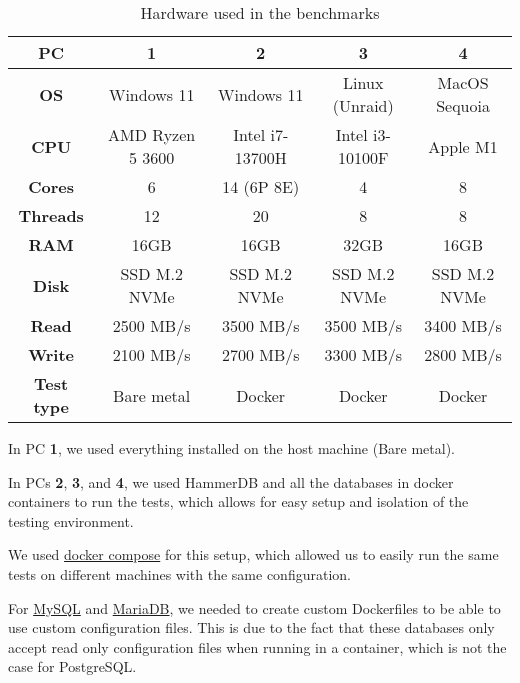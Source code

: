 \begin{table}[h!]
    \centering
    \begin{tabular}{|c|c|c|c|c|}
        \hline
        \textbf{PC}        & \textbf{1}       & \textbf{2}      & \textbf{3}      & \textbf{4}    \\
        \hline
        \textbf{OS}        & Windows 11       & Windows 11      & Linux (Unraid)  & MacOS Sequoia \\
        \hline
        \textbf{CPU}       & AMD Ryzen 5 3600 & Intel i7-13700H & Intel i3-10100F & Apple M1      \\
        \hline
        \textbf{Cores}     & 6                & 14 (6P 8E)      & 4               & 8             \\
        \hline
        \textbf{Threads}   & 12               & 20              & 8               & 8             \\
        \hline
        \textbf{RAM}       & 16GB             & 16GB            & 32GB            & 16GB          \\
        \hline
        \textbf{Disk}      & SSD M.2 NVMe     & SSD M.2 NVMe    & SSD M.2 NVMe    & SSD M.2 NVMe  \\
        \hline
        \textbf{Read}      & 2500 MB/s        & 3500 MB/s       & 3500 MB/s       & 3400 MB/s     \\
        \hline
        \textbf{Write}     & 2100 MB/s        & 2700 MB/s       & 3300 MB/s       & 2800 MB/s     \\
        \hline
        \textbf{Test type} & Bare metal       & Docker          & Docker          & Docker        \\
        \hline
    \end{tabular}
    \caption{Hardware used in the benchmarks}
    \label{tab:hardware-setup}
\end{table}

In PC \textbf{1}, we used everything installed on the host machine (Bare metal).

In PCs \textbf{2}, \textbf{3}, and \textbf{4}, we used HammerDB and all the databases in docker containers to run the tests, which allows for easy setup and isolation of the testing environment.

We used \hyperref[sec:docker-compose]{docker compose} for this setup, which allowed us to easily run the same tests on different machines with the same configuration.

For \hyperref[sec:dockerfile-mysql]{MySQL} and \hyperref[sec:dockerfile-mariadb]{MariaDB}, we needed to create custom Dockerfiles to be able to use custom configuration files. This is due to the fact that these databases only accept read only configuration files when running in a container, which is not the case for PostgreSQL.

